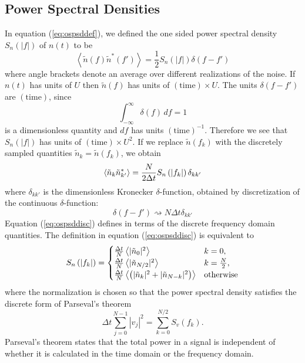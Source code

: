 \subsection{Power Spectral Densities}
\label{ss:psdconv}

In equation (\ref{eq:ospsddef}), we defined the one sided power spectral
density $S_n(|f|)$ of $n(t)$ to be 
\begin{equation}
\left\langle\tilde{n}(f) \tilde{n}^\ast(f')\right\rangle = 
\frac{1}{2}S_n(|f|)\delta(f-f')
\end{equation}
where angle brackets denote an average over different realizations of the noise.
If $n(t)$ has units of $U$ then $\tilde{n}(f)$ has units of
$(\mathrm{time}) \times U$. The units $\delta(f-f')$ are $(\mathrm{time})$,
since 
\begin{equation}
\int_{-\infty}^\infty \delta(f)\,df = 1
\end{equation}
is a dimensionless quantity and $df$ has units $(\mathrm{time})^{-1}$.
Therefore we see that $S_n(|f|)$ has units of $(\mathrm{time})\times U^2$.
If we replace $\tilde{n}(f_k)$ with the discretely sampled quantities 
$\tilde{n}_k = \tilde{n}(f_k)$, we obtain
\begin{equation}
\left\langle\tilde{n}_k \tilde{n}_{k'}^\ast\right\rangle = 
\frac{N}{2\Delta t}S_n\left(\left|f_{k}\right|\right)\delta_{kk'}
\label{eq:ospsddisc}
\end{equation}
where $\delta_{kk'}$ is the dimensionless Kronecker $\delta$-function,
obtained by discretization of the continuous $\delta$-function:
\begin{equation}
\delta(f-f') \rightsquigarrow N\Delta t\delta_{kk'}
\end{equation}
Equation (\ref{eq:ospsddisc}) defines \ospsd in terms of the discrete
frequency domain quantities.  The definition in equation (\ref{eq:ospsddisc}) is
equivalent to
\begin{equation}
S_n\left(\left|f_{k}\right|\right) =
\begin{cases}
\frac{\Delta t}{N} \left\langle | \tilde{n}_0 |^2 \right\rangle & k = 0, \\
\frac{\Delta t}{N} \left\langle| \tilde{n}_{N/2} |^2\right\rangle & k = \frac{N}{2}, \\
\frac{\Delta t}{N} \left\langle \left( | \tilde{n}_k |^2 + | \tilde{n}_{N-k} |^2 \right)\right\rangle & \text{otherwise}
\end{cases}
\end{equation}
where the normalization is chosen so that the power spectral
density satisfies the discrete form of Parseval's theorem
\begin{equation}
\Delta t \sum_{j=0}^{N-1} |v_j|^2 = \sum_{k=0}^{N/2} S_v(f_k).
\end{equation}
Parseval's theorem states that the total power in a signal is independent of
whether it is calculated in the time domain or the frequency domain.

